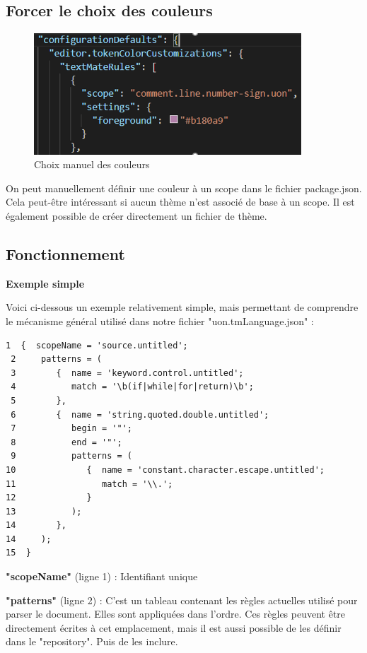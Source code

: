\documentclass[
    iict, %
    il, %
]{heig-tb}
\begin{document}
\subsection{Forcer le choix des couleurs}
\begin{figure}[!h]
    \begin{center}
        \includegraphics[width=10cm]{assets/figures/manual-settings-color.png}
    \end{center}
    \caption[Choix manuel des couleurs]{\label{manual-settings-color} Choix manuel des couleurs}
\end{figure}

On peut manuellement définir une couleur à un scope dans le fichier package.json.
Cela peut-être intéressant si aucun thème n'est associé de base à un scope.
Il est également possible de créer directement un fichier de thème.

\subsection{Fonctionnement}
\textbf{Exemple simple}

Voici ci-dessous un exemple relativement simple, mais permettant de comprendre le mécanisme général utilisé dans notre fichier "uon.tmLanguage.json" :
\begin{lstlisting}[frame=single, caption={Textmate grammar},label={Textmate grammar}]
 1  {  scopeName = 'source.untitled';
 2     patterns = (
 3        {  name = 'keyword.control.untitled';
 4           match = '\b(if|while|for|return)\b';
 5        },
 6        {  name = 'string.quoted.double.untitled';
 7           begin = '"';
 8           end = '"';
 9           patterns = (
10              {  name = 'constant.character.escape.untitled';
11                 match = '\\.';
12              }
13           );
14        },
14     );
15  }
\end{lstlisting}
\textbf{"scopeName"} (ligne 1) : Identifiant unique

\textbf{"patterns"} (ligne 2) : C'est un tableau contenant les règles actuelles utilisé pour parser le document. Elles sont appliquées dans l'ordre.
Ces règles peuvent être directement écrites à cet emplacement, mais il est aussi possible de les définir dans le "repository". Puis de les inclure.
\end{document}
